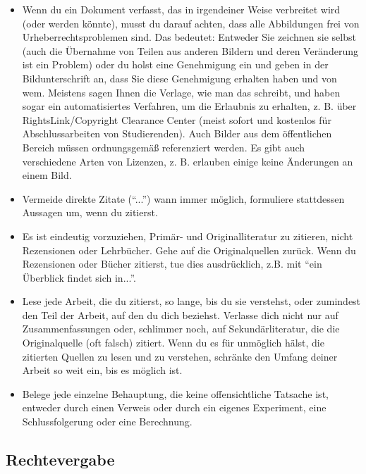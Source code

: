 \begin{itemize}
\item Wenn du ein Dokument verfasst, das in irgendeiner Weise verbreitet wird (oder werden könnte), musst du darauf achten, dass alle Abbildungen frei von Urheberrechtsproblemen sind. Das bedeutet: Entweder Sie zeichnen sie selbst (auch die Übernahme von Teilen aus anderen Bildern und deren Veränderung ist ein Problem) oder du holst eine Genehmigung ein und geben in der Bildunterschrift an, dass Sie diese Genehmigung erhalten haben und von wem. Meistens sagen Ihnen die Verlage, wie man das schreibt, und haben sogar ein automatisiertes Verfahren, um die Erlaubnis zu erhalten, z. B. über RightsLink/Copyright Clearance Center (meist sofort und kostenlos für Abschlussarbeiten von Studierenden). Auch Bilder aus dem öffentlichen Bereich müssen ordnungsgemäß referenziert werden. Es gibt auch verschiedene Arten von Lizenzen, z. B. erlauben einige keine Änderungen an einem Bild.

\item Vermeide direkte Zitate (``...'') wann immer möglich, formuliere stattdessen Aussagen um, wenn du zitierst.

\item Es ist eindeutig vorzuziehen, Primär- und Originalliteratur zu zitieren, nicht Rezensionen oder Lehrbücher. Gehe  auf die Originalquellen zurück. Wenn du Rezensionen oder Bücher zitierst, tue dies ausdrücklich, z.B. mit ``ein Überblick findet sich in...''.

\item Lese jede Arbeit, die du zitierst, so lange, bis du sie verstehst, oder zumindest den Teil der Arbeit, auf den du dich beziehst. Verlasse dich nicht nur auf Zusammenfassungen oder, schlimmer noch, auf Sekundärliteratur, die die Originalquelle (oft falsch) zitiert. Wenn du es für unmöglich hälst, die zitierten Quellen zu lesen und zu verstehen, schränke den Umfang deiner Arbeit so weit ein, bis es möglich ist.

\item Belege jede einzelne Behauptung, die keine offensichtliche Tatsache ist, entweder durch einen Verweis oder durch ein eigenes Experiment, eine Schlussfolgerung oder eine Berechnung. 

\cite{Menge}
\end{itemize}
\subsection{Rechtevergabe}
\label{sec:lizenzen}

